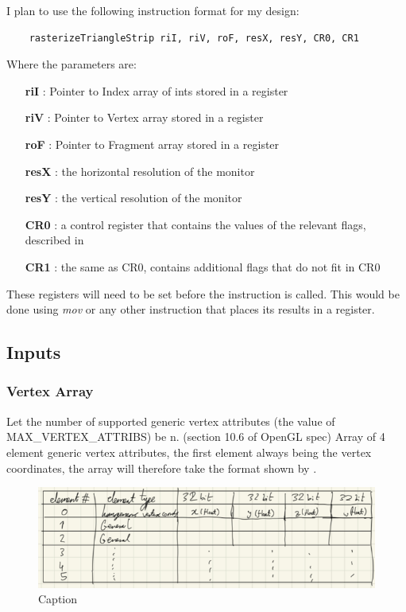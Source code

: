 I plan to use the following instruction format for my design:

\begin{verbatim}
    rasterizeTriangleStrip riI, riV, roF, resX, resY, CR0, CR1

\end{verbatim}

Where the parameters are:


\begin{itemize}
    \item[\textbf{riI}]: Pointer to Index array of ints stored in a register
    \item[\textbf{riV}]: Pointer to Vertex array stored in a register
    \item[\textbf{roF}]: Pointer to Fragment array stored in a register
    \item[\textbf{resX}]: the horizontal resolution of the monitor
    \item[\textbf{resY}]: the vertical resolution of the monitor
    \item[\textbf{CR0}]: a control register that contains the values of the relevant flags, described in 
    \item[\textbf{CR1}]: the same as CR0, contains additional flags that do not fit in CR0
\end{itemize}
These registers will need to be set before the instruction is called. This would be done using \textit{mov} or any other instruction that places its results in a register.


\subsection{Inputs}
\subsubsection{Vertex Array}
Let the number of supported generic vertex attributes (the value of MAX\_VERTEX\_ATTRIBS) be n. (section 10.6 of OpenGL spec)
Array of 4 element generic vertex attributes, the first element always being the vertex coordinates, the array will therefore take the format shown by .

\begin{figure}[ht]
    \centering
    \includegraphics{functional_spec/images/VertexArrayFormat.png}
    \caption{Caption}
    \label{fig:VertexArrayFormat}
\end{figure}

